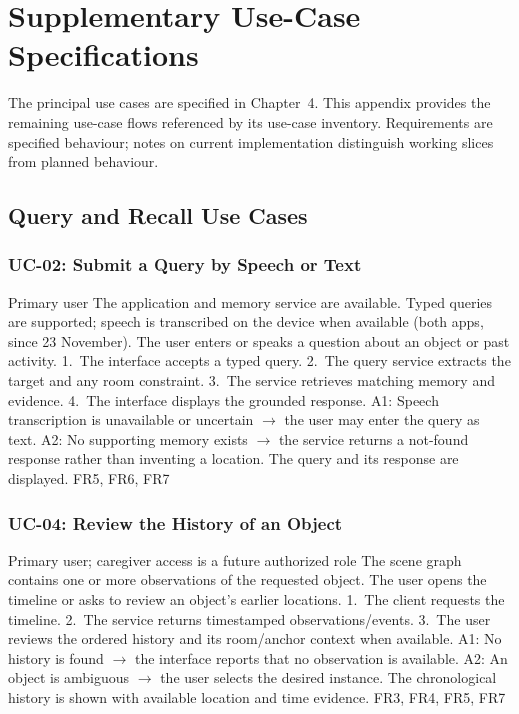 \chapter{Supplementary Use-Case Specifications}
\label{app:usecases}

The principal use cases are specified in Chapter~4. This appendix provides the
remaining use-case flows referenced by its use-case inventory. Requirements are
specified behaviour; notes on current implementation distinguish working
slices from planned behaviour.

\section{Query and Recall Use Cases}
\subsection{UC-02: Submit a Query by Speech or Text}
{Primary user}
{The application and memory service are available. Typed queries are supported; speech is transcribed on the device when available (both apps, since 23 November).}
{The user enters or speaks a question about an object or past activity.}
{1.~The interface accepts a typed query. 2.~The query service extracts the target and any room constraint. 3.~The service retrieves matching memory and evidence. 4.~The interface displays the grounded response.}
{A1: Speech transcription is unavailable or uncertain $\rightarrow$ the user may enter the query as text. A2: No supporting memory exists $\rightarrow$ the service returns a not-found response rather than inventing a location.}
{The query and its response are displayed.}
{FR5, FR6, FR7}

\subsection{UC-04: Review the History of an Object}
{Primary user; caregiver access is a future authorized role}
{The scene graph contains one or more observations of the requested object.}
{The user opens the timeline or asks to review an object's earlier locations.}
{1.~The client requests the timeline. 2.~The service returns timestamped observations/events. 3.~The user reviews the ordered history and its room/anchor context when available.}
{A1: No history is found $\rightarrow$ the interface reports that no observation is available. A2: An object is ambiguous $\rightarrow$ the user selects the desired instance.}
{The chronological history is shown with available location and time evidence.}
{FR3, FR4, FR5, FR7}

